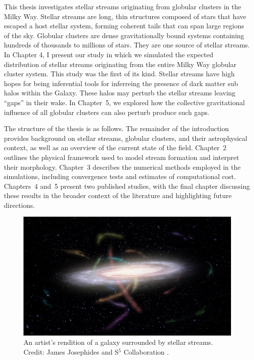\documentclass{article}
\begin{document}
This thesis investigates stellar streams originating from globular clusters in the Milky Way. Stellar streams are long, thin structures composed of stars that have escaped a host stellar system, forming coherent tails that can span large regions of the sky. Globular clusters are dense gravitationally bound systems containing hundreds of thousands to millions of stars. They are one source of stellar streams. In Chapter 4, I present our study in which we simulated the expected distribution of stellar streams originating from the entire Milky Way globular cluster system. This study was the first of its kind. Stellar streams have high hopes for being inferential tools for inferreing the presence of dark matter sub halos within the Galaxy. These halos may perturb the stellar streams leaving ``gaps'' in their wake. In Chapter~5, we explored how the collective gravitational influence of all globular clusters can also perturb produce such gaps.

The structure of the thesis is as follows. The remainder of the introduction provides background on stellar streams, globular clusters, and their astrophysical context, as well as an overview of the current state of the field. Chapter~2 outlines the physical framework used to model stream formation and interpret their morphology. Chapter~3 describes the numerical methods employed in the simulations, including convergence tests and estimates of computational cost. Chapters~4 and~5 present two published studies, with the final chapter discussing these results in the broader context of the literature and highlighting future directions.
\begin{figure}
    \centering
    \includegraphics[width=\linewidth]{images/S5MilkywayStreams.jpg}
    \caption{An artist's rendition of a galaxy surrounded by stellar streams. Credit: James Josephides and S$^5$ Collaboration \citep{2019MNRAS.490.3508L}.}
    \label{fig:S5MilkywayStreams}
\end{figure}
\end{document}
